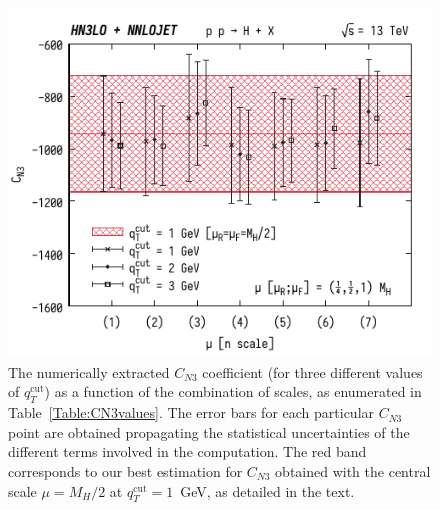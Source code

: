 \documentclass[12pt]{article}
\DeclareRobustCommand{\qtcut}{\ensuremath{q_T^\mathrm{cut}}}
\begin{document}
\begin{figure}
\centering
\includegraphics[width=.6\linewidth]{./new_figures/CN3_new_7_point_qT1_qT2_qT3}
\caption{\label{fig:CN3qT}{The numerically extracted $C_{N3}$ coefficient (for three different values of $\qtcut$) as a function of the combination of scales, as enumerated in Table~\ref{Table:CN3values}.
The error bars for each particular $C_{N3}$ point are obtained propagating the statistical uncertainties of the different terms involved in the computation. The red band corresponds to our best estimation for $C_{N3}$ obtained with the central scale $\mu=M_{H}/2$ at $\qtcut=1$~GeV, as detailed in the text.}}
\end{figure}
\end{document}
